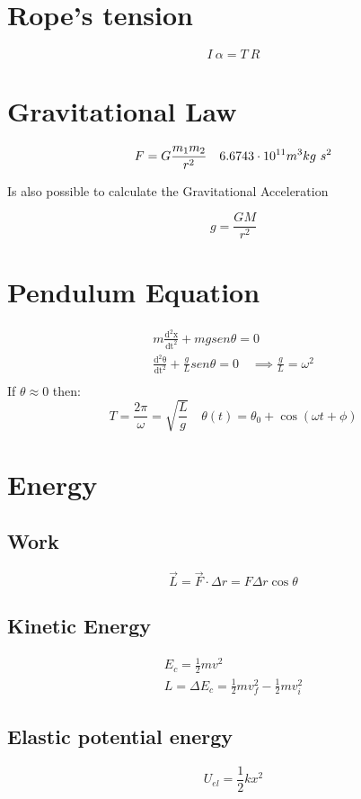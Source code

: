 \documentclass[Master.tex]{subfiles}
\begin{document}
\begin{multicols}{2}
		 \section{Rope's tension}
		  \[
				   I ~ \alpha = T ~ R
		  \]

		 \section{Gravitational Law}
		  \[
				   F = G \frac{m_1 m_2}{r^2} \quad 6.6743 \cdot 10^{11}   m^3 kg~ s^2\\
		  \]

		  Is also possible to calculate the Gravitational Acceleration

		  \[
				   g = \frac{GM}{r^2}
		  \]

		 \section{Pendulum Equation}
		  \begin{gather*}
				   m \frac{\mathrm{d^2x}}{\mathrm{dt^{2}}} + mg sen \theta = 0  \\
				   \frac{\mathrm{d^2\theta }}{\mathrm{dt^{2}}} + \frac{g}{L} sen \theta = 0 \quad \implies \frac{g}{L}=\omega ^2 \\
		  \end{gather*}
		  If \( \theta \approx 0\) then:
		  \[
				   T = \frac{2\pi }{\omega } = \sqrt{\frac{L}{g}} \quad \theta (t) = \theta_{0} + \cos (\omega t + \phi )
		  \]

		 \section{Energy}
		  \subsection{Work}
				   \[
						    \vec{L}= \vec{F} \cdot \Delta r = F \Delta r\cos \theta
				   \]
		  \subsection{Kinetic Energy}
				   \begin{gather*}
						    E_{c} = \frac{1}{2}mv^2 \\
						    L = \Delta E_{c} = \frac{1}{2}mv_{f} ^2 - \frac{1}{2}mv_{i} ^2
				   \end{gather*}
		  \subsection{Elastic potential energy}
				   \[
						    U_{el} = \frac{1}{2}kx^2
				   \]


\end{multicols}
\end{document}
